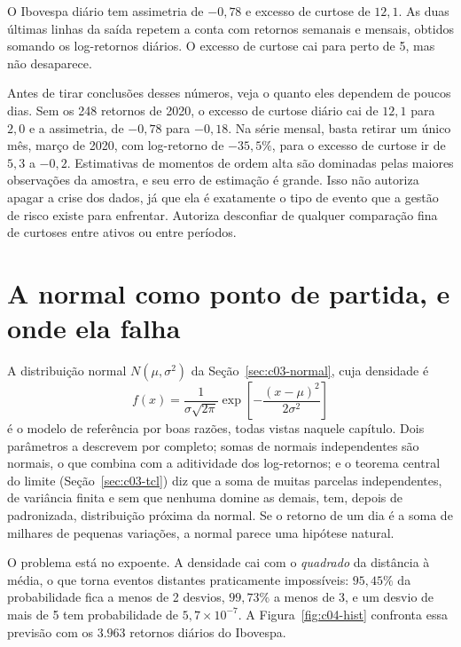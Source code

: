 O Ibovespa diário tem assimetria de $-0,78$ e excesso de curtose de $12,1$. As duas últimas linhas da saída repetem a conta com retornos semanais e mensais, obtidos somando os log-retornos diários. O excesso de curtose cai para perto de 5, mas não desaparece.

Antes de tirar conclusões desses números, veja o quanto eles dependem de poucos dias. Sem os 248 retornos de 2020, o excesso de curtose diário cai de $12,1$ para $2,0$ e a assimetria, de $-0,78$ para $-0,18$. Na série mensal, basta retirar um único mês, março de 2020, com log-retorno de $-35,5\%$, para o excesso de curtose ir de $5,3$ a $-0,2$. Estimativas de momentos de ordem alta são dominadas pelas maiores observações da amostra, e seu erro de estimação é grande. Isso não autoriza apagar a crise dos dados, já que ela é exatamente o tipo de evento que a gestão de risco existe para enfrentar. Autoriza desconfiar de qualquer comparação fina de curtoses entre ativos ou entre períodos.

\section{A normal como ponto de partida, e onde ela falha}
\label{sec:c04-normal}

A distribuição normal $N(\mu, \sigma^2)$ da Seção~\ref{sec:c03-normal}, cuja densidade é
\begin{equation}
  f(x) = \frac{1}{\sigma\sqrt{2\pi}} \exp\!\left[-\frac{(x-\mu)^2}{2\sigma^2}\right]
  \label{eq:c04-normal}
\end{equation}
é o modelo de referência por boas razões, todas vistas naquele capítulo. Dois parâmetros a descrevem por completo; somas de normais independentes são normais, o que combina com a aditividade dos log-retornos; e o teorema central do limite (Seção~\ref{sec:c03-tcl}) diz que a soma de muitas parcelas independentes, de variância finita e sem que nenhuma domine as demais, tem, depois de padronizada, distribuição próxima da normal. Se o retorno de um dia é a soma de milhares de pequenas variações, a normal parece uma hipótese natural.

O problema está no expoente. A densidade cai com o \emph{quadrado} da distância à média, o que torna eventos distantes praticamente impossíveis: $95,45\%$ da probabilidade fica a menos de 2 desvios, $99,73\%$ a menos de 3, e um desvio de mais de 5 tem probabilidade de $5,7 \times 10^{-7}$. A Figura~\ref{fig:c04-hist} confronta essa previsão com os $3.963$ retornos diários do Ibovespa.

